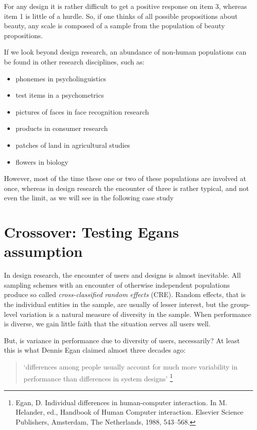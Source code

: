 \documentclass[]{svmono}
\providecommand{\tightlist}{%
  \setlength{\itemsep}{0pt}\setlength{\parskip}{0pt}}
\theoremstyle{definition}
\theoremstyle{definition}
\theoremstyle{definition}
\theoremstyle{remark}
\begin{document}
For any design it is rather difficult to get a positive response on item
3, whereas item 1 is little of a hurdle. So, if one thinks of all
possible propositions about beauty, any scale is composed of a sample
from the population of beauty propositions.

If we look beyond design research, an abundance of non-human populations
can be found in other research disciplines, such as:

\begin{itemize}
\tightlist
\item
  phonemes in psycholinguistics
\item
  test items in a psychometrics
\item
  pictures of faces in face recognition research
\item
  products in consumer research
\item
  patches of land in agricultural studies
\item
  flowers in biology
\end{itemize}

However, most of the time these one or two of these populations are
involved at once, whereas in design research the encounter of three is
rather typical, and not even the limit, as we will see in the following
case study

\section{Crossover: Testing Egans assumption}\label{crossover}

In design research, the encounter of users and designs is almost
inevitable. All sampling schemes with an encounter of otherwise
independent populations produce so called \emph{cross-classified random
effects} (CRE). Random effects, that is the individual entities in the
sample, are usually of lesser interest, but the group-level variation is
a natural measure of diversity in the sample. When performance is
diverse, we gain little faith that the situation serves all users well.

But, is variance in performance due to diversity of users, necessarily?
At least this is what Dennis Egan claimed almost three decades ago:

\begin{quote}
`differences among people usually account for much more variability in
performance than differences in system designs' \footnote{Egan, D.
  Individual differences in human-computer interaction. In M. Helander,
  ed., Handbook of Human Computer interaction. Elsevier Science
  Publishers, Amsterdam, The Netherlands, 1988, 543--568.}
\end{quote}
\end{document}
